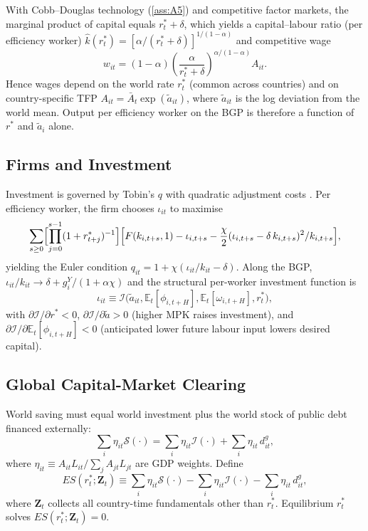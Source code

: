 With Cobb--Douglas technology (\cref{ass:A5}) and competitive factor markets,
the marginal product of capital equals $r_t^*+\delta$, which yields a
capital--labour ratio (per efficiency worker) $\hat k(r_t^*)=[\alpha/(r_t^*+\delta)]^{1/(1-\alpha)}$
and competitive wage
\begin{equation}
w_{it}=(1-\alpha)\left(\frac{\alpha}{r_t^*+\delta}\right)^{\alpha/(1-\alpha)} A_{it}.
\label{eq:wage}
\end{equation}
Hence wages depend on the world rate $r_t^*$ (common across countries) and on
country-specific TFP $A_{it}=\bar A_t\exp(\tilde a_{it})$, where $\tilde a_{it}$
is the log deviation from the world mean. Output per efficiency worker on the
BGP is therefore a function of $r^*$ and $\tilde a_i$ alone.

\subsection{Firms and Investment}\label{sec:theory:firms}

Investment is governed by Tobin's $q$ with quadratic adjustment costs
\citep{Hayashi1982}. Per efficiency worker, the firm chooses $\iota_{it}$ to
maximise
\[
\sum_{s\ge 0}\Bigl[\prod_{j=0}^{s-1}(1+r_{t+j}^*)^{-1}\Bigr]\Bigl[F(k_{i,t+s},1)-\iota_{i,t+s}-\frac{\chi}{2}(\iota_{i,t+s}-\delta\,k_{i,t+s})^2/k_{i,t+s}\Bigr],
\]
yielding the Euler condition $q_{it}=1+\chi(\iota_{it}/k_{it}-\delta)$. Along
the BGP, $\iota_{it}/k_{it}\to \delta+g_i^Y/(1+\alpha\chi)$ and the structural
per-worker investment function is
\begin{equation}
\iota_{it}\equiv\mathcal{I}\bigl(\tilde a_{it},\mathbb{E}_t[\phi_{i,t+H}],\mathbb{E}_t[\omega_{i,t+H}],r_t^*\bigr),
\label{eq:I-function}
\end{equation}
with $\partial\mathcal{I}/\partial r^*<0$, $\partial\mathcal{I}/\partial\tilde a>0$
(higher MPK raises investment), and $\partial\mathcal{I}/\partial\mathbb{E}_t[\phi_{i,t+H}]<0$
(anticipated lower future labour input lowers desired capital).

\subsection{Global Capital-Market Clearing}\label{sec:theory:clearing}

World saving must equal world investment plus the world stock of public debt
financed externally:
\begin{equation}
\sum_i \eta_{it}\mathcal{S}(\cdot)=\sum_i \eta_{it}\mathcal{I}(\cdot)+\sum_i \eta_{it}\,d_{it}^g,
\label{eq:world-clearing}
\end{equation}
where $\eta_{it}\equiv A_{it}L_{it}/\sum_j A_{jt}L_{jt}$ are GDP weights. Define
\[
ES(r_t^*;\mathbf Z_t)\equiv \sum_i\eta_{it}\mathcal{S}(\cdot)-\sum_i\eta_{it}\mathcal{I}(\cdot)-\sum_i\eta_{it}\,d_{it}^g,
\]
where $\mathbf Z_t$ collects all country-time fundamentals other than $r_t^*$.
Equilibrium $r_t^*$ solves $ES(r_t^*;\mathbf Z_t)=0$.

